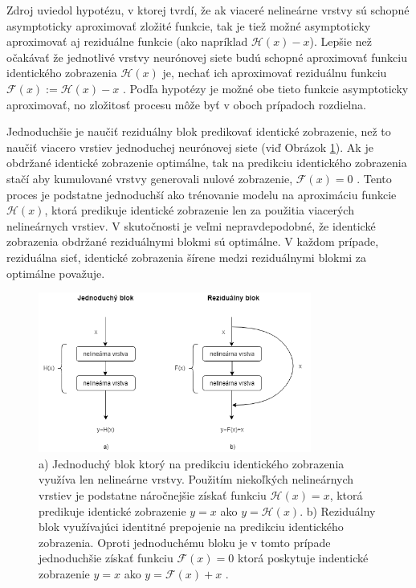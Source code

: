 Zdroj \cite{Wu2017} uviedol hypotézu, v ktorej tvrdí, že ak viaceré nelineárne vrstvy sú schopné asymptoticky aproximovať zložité funkcie, tak je tiež možné asymptoticky aproximovať aj reziduálne funkcie (ako napríklad $\mathcal{H}(x) - x$). Lepšie než očakávať že jednotlivé vrstvy neurónovej siete budú schopné aproximovať funkciu identického zobrazenia $\mathcal{H}(x)$ je, nechať ich aproximovať reziduálnu funkciu $\mathcal{F}(x) := \mathcal{H}(x) - x$ \cite{Wu2017}. Podľa hypotézy je možné obe tieto funkcie asymptoticky aproximovať, no zložitosť procesu môže byť v oboch prípadoch rozdielna.

Jednoduchšie je naučiť reziduálny blok predikovať identické zobrazenie, než to naučiť viacero vrstiev jednoduchej neurónovej siete (viď Obrázok \ref{fig:plainNetVsResNet}). Ak je obdržané identické zobrazenie optimálne, tak na predikciu identického zobrazenia stačí aby kumulované vrstvy generovali nulové zobrazenie, $\mathcal{F}(x)=0$ \cite{Wu2017}. Tento proces je podstatne jednoduchší ako trénovanie modelu na aproximáciu funkcie $\mathcal{H}(x)$, ktorá predikuje identické zobrazenie len za použitia viacerých nelineárnych vrstiev. V skutočnosti je veľmi nepravdepodobné, že identické zobrazenia obdržané reziduálnymi blokmi sú optimálne. V každom prípade, reziduálna sieť, identické zobrazenia šírene medzi reziduálnymi blokmi za optimálne považuje.

\begin{figure}

\centerline{\includegraphics[width=0.8\textwidth]{images/plainNetVsResNet}}
\caption[Porovnanie jednoduhcého a reziduálneho bloku]{a) Jednoduchý blok ktorý na predikciu identického zobrazenia využíva len nelineárne vrstvy. Použitím niekoľkých nelineárnych vrstiev je podstatne náročnejšie získať funkciu $\mathcal{H}(x)=x$, ktorá predikuje identické zobrazenie $y=x$ ako $y=\mathcal{H}(x)$. b) Reziduálny blok využívajúci identitné prepojenie na predikciu identického zobrazenia. Oproti jednoduchému bloku je v tomto prípade jednoduchšie získať funkciu $\mathcal{F}(x)=0$ ktorá poskytuje indentické zobrazenie $y=x$ ako $y=\mathcal{F}(x)+x$ \cite{Wu2017}.}
\label{fig:plainNetVsResNet}
\end{figure}


